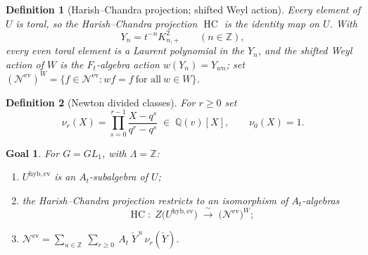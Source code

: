 \documentclass[11pt]{article}
\newtheorem{definition}{Definition}
\newtheorem*{goal}{Goal}
\newcommand{\At}{A_t}
\newcommand{\Ft}{F_t}
\newcommand{\Nev}{\mathcal N^{\mathrm{ev}}}
\newcommand{\Uev}{U^{\mathrm{hyb,ev}}}
\newcommand{\HC}{\operatorname{HC}}
\newcommand{\Yc}{\check Y}
\begin{document}
\begin{definition}[Harish--Chandra projection; shifted Weyl action]\label{def:hc}
Every element of $U$ is toral, so the \emph{Harish--Chandra projection} $\HC$ is
the identity map on $U$. With
\[
  Y_n=t^{-n}K_{n,+}^{2}\qquad(n\in\mathbb Z),
\]
every even toral element is a Laurent polynomial in the $Y_n$, and the
\emph{shifted Weyl action} of $W$ is the $\Ft$-algebra action
$w(Y_n)=Y_{wn}$; set $(\Nev)^{W}=\{f\in\Nev: wf=f\ \text{for all}\ w\in W\}$.
\end{definition}

\begin{definition}[Newton divided classes]\label{def:nu}
For $r\ge0$ set
\[
  \nu_{r}(X)=\prod_{s=0}^{r-1}\frac{X-q^{s}}{q^{r}-q^{s}}\;\in\;\mathbb Q(v)[X],
  \qquad \nu_0(X)=1 .
\]
\end{definition}

\begin{goal}\label{goal:main}
For $G=GL_1$, with $\Lambda=\mathbb Z$:
\begin{enumerate}
  \item[(i)] $\Uev$ is an $\At$-subalgebra of $U$;
  \item[(ii)] the Harish--Chandra projection restricts to an isomorphism of
  $\At$-algebras
  \[
    \HC:\;Z\bigl(\Uev\bigr)\;\xrightarrow{\ \sim\ }\;\bigl(\Nev\bigr)^{W};
  \]
  \item[(iii)] $\displaystyle
    \Nev=\sum_{u\in\mathbb Z}\ \sum_{r\ge0}\ \At\;\Yc^{\,u}\,\nu_{r}(\Yc)$.
\end{enumerate}
\end{goal}
\end{document}

